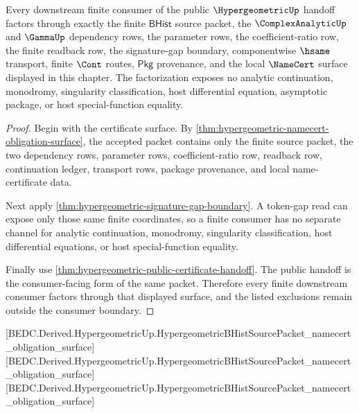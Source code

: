 \begin{theorem}
\label{thm:hypergeometric-finite-consumer-completeness}
Every downstream finite consumer of the public $\HypergeometricUp$ handoff
factors through exactly the finite $\mathsf{BHist}$ source packet, the
$\ComplexAnalyticUp$ and $\GammaUp$ dependency rows, the parameter rows, the
coefficient-ratio row, the finite readback row, the signature-gap boundary,
componentwise $\hsame$ transport, finite $\Cont$ routes, $\mathsf{Pkg}$
provenance, and the local $\NameCert$ surface displayed in this chapter. The
factorization exposes no analytic continuation, monodromy, singularity
classification, host differential equation, asymptotic package, or host
special-function equality.
\end{theorem}
\begin{proof}
Begin with the certificate surface. By
\autoref{thm:hypergeometric-namecert-obligation-surface}, the accepted packet
contains only the finite source packet, the two dependency rows, parameter
rows, coefficient-ratio row, readback row, continuation ledger, transport
rows, package provenance, and local name-certificate data.

Next apply \autoref{thm:hypergeometric-signature-gap-boundary}. A token-gap
read can expose only those same finite coordinates, so a finite consumer has no
separate channel for analytic continuation, monodromy, singularity
classification, host differential equations, or host special-function
equality.

Finally use \autoref{thm:hypergeometric-public-certificate-handoff}. The
public handoff is the consumer-facing form of the same packet. Therefore every
finite downstream consumer factors through that displayed surface, and the
listed exclusions remain outside the consumer boundary.
\end{proof}

[BEDC.Derived.HypergeometricUp.HypergeometricBHistSourcePacket\_namecert\_obligation\_surface]
[BEDC.Derived.HypergeometricUp.HypergeometricBHistSourcePacket\_namecert\_obligation\_surface]
[BEDC.Derived.HypergeometricUp.HypergeometricBHistSourcePacket\_namecert\_obligation\_surface]

